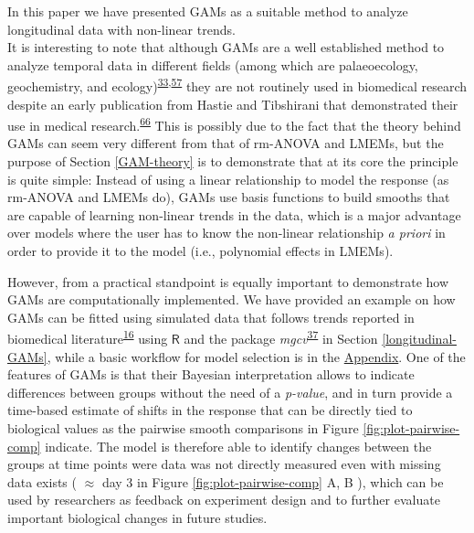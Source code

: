 \documentclass[
]{article}
\begin{document}
In this paper we have presented GAMs as a suitable method to analyze longitudinal data with non-linear trends.\\
It is interesting to note that although GAMs are a well established method to analyze temporal data in different fields (among which are palaeoecology, geochemistry, and ecology)\textsuperscript{\protect\hyperlink{ref-pedersen2019}{33},\protect\hyperlink{ref-hefley2017}{57}} they are not routinely used in biomedical research despite an early publication from Hastie and Tibshirani that demonstrated their use in medical research.\textsuperscript{\protect\hyperlink{ref-hastie1995}{66}} This is possibly due to the fact that the theory behind GAMs can seem very different from that of rm-ANOVA and LMEMs, but the purpose of Section \ref{GAM-theory} is to demonstrate that at its core the principle is quite simple: Instead of using a linear relationship to model the response (as rm-ANOVA and LMEMs do), GAMs use basis functions to build smooths that are capable of learning non-linear trends in the data, which is a major advantage over models where the user has to know the non-linear relationship \emph{a priori} in order to provide it to the model (i.e., polynomial effects in LMEMs).

However, from a practical standpoint is equally important to demonstrate how GAMs are computationally implemented. We have provided an example on how GAMs can be fitted using simulated data that follows trends reported in biomedical literature\textsuperscript{\protect\hyperlink{ref-vishwanath2009}{16}} using \(\textsf{R}\) and the package \emph{mgcv}\textsuperscript{\protect\hyperlink{ref-wood2017}{37}} in Section \ref{longitudinal-GAMs}, while a basic workflow for model selection is in the \protect\hyperlink{workflow}{Appendix}. One of the features of GAMs is that their Bayesian interpretation allows to indicate differences between groups without the need of a \emph{p-value}, and in turn provide a time-based estimate of shifts in the response that can be directly tied to biological values as the pairwise smooth comparisons in Figure \ref{fig:plot-pairwise-comp} indicate. The model is therefore able to identify changes between the groups at time points were data was not directly measured even with missing data exists ( \(\approx\) day 3 in Figure \ref{fig:plot-pairwise-comp} A, B ), which can be used by researchers as feedback on experiment design and to further evaluate important biological changes in future studies.
\end{document}
